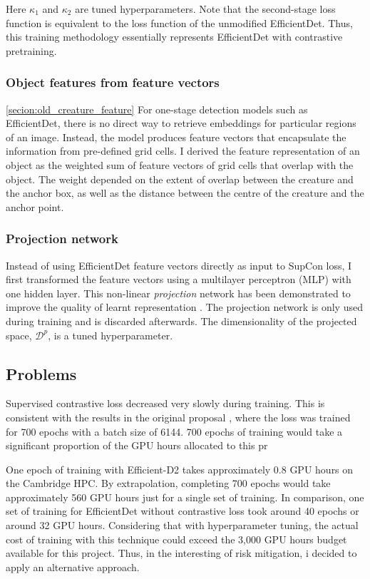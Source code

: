 \documentclass[12pt,a4paper,twoside,openany]{report}
\begin{document}
Here $\kappa_1$ and $\kappa_2$ are tuned hyperparameters. 
Note that the second-stage loss function is equivalent to the loss function of the unmodified EfficientDet. Thus, this training methodology essentially represents EfficientDet with contrastive pretraining.

\subsubsection{Object features from feature vectors} \ref{secion:old_creature_feature}
For one-stage detection models such as EfficientDet, there is no direct way to retrieve embeddings for particular regions of an image. Instead, the model produces feature vectors that encapsulate the information from pre-defined grid cells. I derived the feature representation of an object as the weighted sum of feature vectors of grid cells that overlap with the object. The weight depended on the extent of overlap between the creature and the anchor box, as well as the distance between the centre of the creature and the anchor point. 


\subsubsection{Projection network}
Instead of using EfficientDet feature vectors directly as input to SupCon loss, I first transformed the feature vectors using a multilayer perceptron (MLP) with one hidden layer. This non-linear \textit{projection} network has been demonstrated to improve the quality of learnt representation \cite{chen_simple_2020}. The projection network is only used during training and is discarded afterwards. The dimensionality of the projected space, $\mathcal{D}^p$, is a tuned hyperparameter. 


\subsection{Problems}
Supervised contrastive loss decreased very slowly during training. This is consistent with the results in the original proposal \cite{khosla_supervised_2021}, where the loss was trained for 700 epochs with a batch size of 6144.
700 epochs of training would take a significant proportion of the GPU hours allocated to this pr

One epoch of training with Efficient-D2 takes approximately 0.8 GPU hours on the Cambridge HPC. By extrapolation, completing 700 epochs would take approximately 560 GPU hours just for a single set of training. In comparison, one set of training for EfficientDet without contrastive loss took around 40 epochs or around 32 GPU hours. Considering that with hyperparameter tuning, the actual cost of training with this technique could exceed the 3,000 GPU hours budget available for this project. Thus, in the interesting of risk mitigation, i decided to apply an alternative approach.
\end{document}
